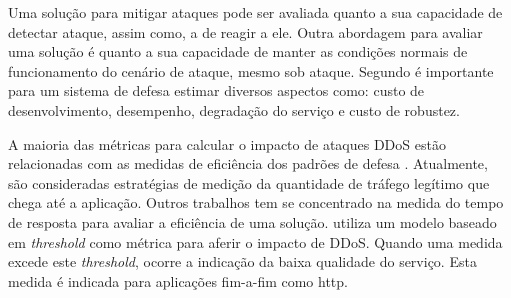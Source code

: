 

%
Uma solução para mitigar ataques pode ser avaliada quanto a sua capacidade de detectar ataque, assim como, a de reagir a ele. Outra abordagem para avaliar uma solução é quanto a sua capacidade de manter as condições normais de funcionamento do cenário de ataque, mesmo sob ataque. Segundo \cite{4600003} é importante para um sistema de defesa estimar diversos aspectos como: custo de desenvolvimento, desempenho, degradação do serviço e custo de robustez. 

A maioria das métricas para calcular o impacto de ataques DDoS estão relacionadas com as medidas de eficiência dos padrões de defesa \cite{4809152}. Atualmente, são consideradas estratégias de medição da quantidade de tráfego legítimo que chega até a aplicação. Outros trabalhos tem se concentrado na medida do tempo de resposta para avaliar a eficiência de uma solução. \cite{Mirkovic:2007:TUM:1281700.1281708} utiliza um modelo baseado em \emph{threshold} como métrica para aferir o impacto de DDoS. Quando uma medida excede este \emph{threshold}, ocorre a  indicação da baixa qualidade do serviço. Esta medida é indicada para aplicações fim-a-fim como http.


